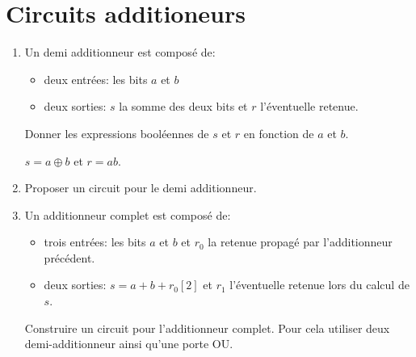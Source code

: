 \documentclass[a4paper,10pt]{exam}
\begin{document}
\section{Circuits additioneurs}
\begin{enumerate}
\item Un demi additionneur est composé de:
  \begin{itemize}
  \item deux entrées: les bits $a$ et $b$
  \item deux sorties: $s$ la somme des deux bits et $r$ l'éventuelle retenue.
  \end{itemize}
  Donner les expressions booléennes de $s$ et $r$ en fonction de $a$ et $b$.
\begin{solution}
  $s = a \oplus b$ et $r = ab$.
\end{solution}
\item Proposer un circuit pour le demi additionneur.
\begin{solution}
\end{solution}
\item Un additionneur complet est composé de:
  \begin{itemize}
    \item trois entrées: les bits $a$ et $b$ et $r_0$ la retenue
      propagé par l'additionneur précédent.
    \item deux sorties: $s = a + b + r_0 [2]$ et $r_1$ l'éventuelle retenue lors
      du calcul de $s$.
  \end{itemize}
  Construire un circuit pour l'additionneur complet. Pour cela utiliser
  deux demi-additionneur ainsi qu'une porte OU.


\end{enumerate}
\end{document}

